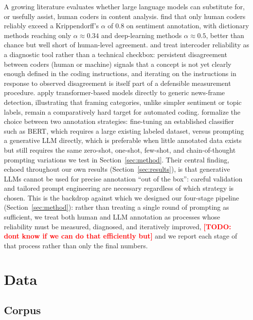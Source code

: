 \documentclass[a4paper,oneside,bibliography=totoc]{scrartcl}
\newcommand{\todo}[1]{\textcolor{red}{\textbf{[TODO: #1]}}}
\begin{document}
A growing literature evaluates whether large language models can substitute for, or usefully assist, human coders in content analysis. \citet{vanatteveldt2021} find that only human coders reliably exceed a Krippendorff's $\alpha$ of 0.8 on sentiment annotation, with dictionary methods reaching only $\alpha \approx 0.34$ and deep-learning methods $\alpha \approx 0.5$, better than chance but well short of human-level agreement. \citet{macphail2016} and \citet{oconnorjoffe2020} treat intercoder reliability as a diagnostic tool rather than a technical checkbox: persistent disagreement between coders (human or machine) signals that a concept is not yet clearly enough defined in the coding instructions, and iterating on the instructions in response to observed disagreement is itself part of a defensible measurement procedure. \citet{jumle2025} apply transformer-based models directly to generic news-frame detection, illustrating that framing categories, unlike simpler sentiment or topic labels, remain a comparatively hard target for automated coding. \citet{weberreichardt2023} formalize the choice between two annotation strategies: fine-tuning an established classifier such as BERT, which requires a large existing labeled dataset, versus prompting a generative LLM directly, which is preferable when little annotated data exists but still requires the same zero-shot, one-shot, few-shot, and chain-of-thought prompting variations we test in Section~\ref{sec:method}. Their central finding, echoed throughout our own results (Section~\ref{sec:results}), is that generative LLMs cannot be used for precise annotation \enquote{out of the box}: careful validation and tailored prompt engineering are necessary regardless of which strategy is chosen. This is the backdrop against which we designed our four-stage pipeline (Section~\ref{sec:method}): rather than treating a single round of prompting as sufficient, we treat both human and LLM annotation as processes whose reliability must be measured, diagnosed, and iteratively improved, \todo{dont know if we can do that efficiently but} and we report each stage of that process rather than only the final numbers. 

\section{Data}
\label{sec:data}

\subsection{Corpus}
\end{document}
